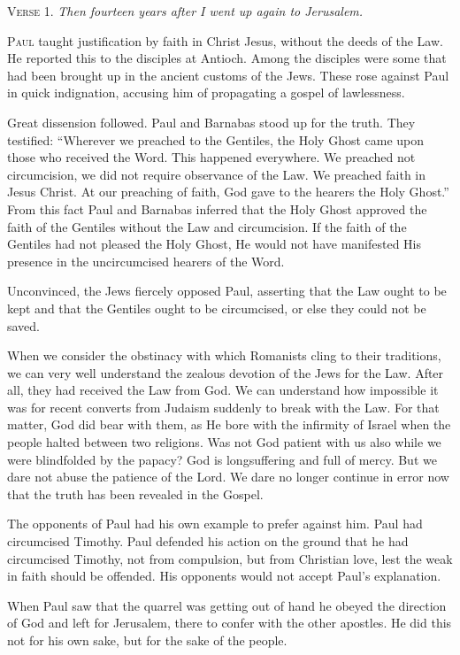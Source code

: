 
\textsc{Verse} 1. \emph{Then fourteen years after I went up again to Jerusalem.}

\textsc{Paul} taught justification by faith in Christ Jesus, without the deeds of the Law. He reported this to the disciples at Antioch. Among the disciples were some that had been brought up in the ancient customs of the Jews. These rose against Paul in quick indignation, accusing him of propagating a gospel of lawlessness.

Great dissension followed. Paul and Barnabas stood up for the truth. They testified: “Wherever we preached to the Gentiles, the Holy Ghost came upon those who received the Word. This happened everywhere. We preached not circumcision, we did not require observance of the Law. We preached faith in Jesus Christ. At our preaching of faith, God gave to the hearers the Holy Ghost.” From this fact Paul and Barnabas inferred that the Holy Ghost approved the faith of the Gentiles without the Law and circumcision. If the faith of the Gentiles had not pleased the Holy Ghost, He would not have manifested His presence in the uncircumcised hearers of the Word.

Unconvinced, the Jews fiercely opposed Paul, asserting that the Law ought to be kept and that the Gentiles ought to be circumcised, or else they could not be saved.

When we consider the obstinacy with which Romanists cling to their traditions, we can very well understand the zealous devotion of the Jews for the Law. After all, they had received the Law from God. We can understand how impossible it was for recent converts from Judaism suddenly to break with the Law. For that matter, God did bear with them, as He bore with the infirmity of Israel when the people halted between two religions. Was not God patient with us also while we were blindfolded by the papacy? God is longsuffering and full of mercy. But we dare not abuse the patience of the Lord. We dare no longer continue in error now that the truth has been revealed in the Gospel.

The opponents of Paul had his own example to prefer against him. Paul had circumcised Timothy. Paul defended his action on the ground that he had circumcised Timothy, not from compulsion, but from Christian love, lest the weak in faith should be offended. His opponents would not accept Paul’s explanation.

When Paul saw that the quarrel was getting out of hand he obeyed the direction of God and left for Jerusalem, there to confer with the other apostles. He did this not for his own sake, but for the sake of the people.

